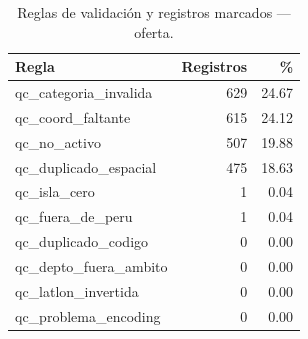 \begin{table}[htbp]\centering
\caption{Reglas de validaci\'on y registros marcados --- oferta.}\label{tab:calidad-oferta}
\begin{tabular}{lrr}
\toprule
Regla & Registros & \% \\
\midrule
qc\_categoria\_invalida & 629 & 24.67 \\
qc\_coord\_faltante & 615 & 24.12 \\
qc\_no\_activo & 507 & 19.88 \\
qc\_duplicado\_espacial & 475 & 18.63 \\
qc\_isla\_cero & 1 & 0.04 \\
qc\_fuera\_de\_peru & 1 & 0.04 \\
qc\_duplicado\_codigo & 0 & 0.00 \\
qc\_depto\_fuera\_ambito & 0 & 0.00 \\
qc\_latlon\_invertida & 0 & 0.00 \\
qc\_problema\_encoding & 0 & 0.00 \\
\bottomrule
\end{tabular}
\end{table}
